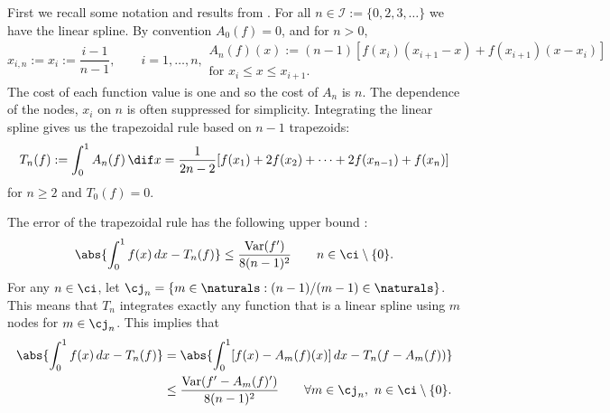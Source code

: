 \documentclass[]{elsarticle}
\DeclareMathOperator{\Var}{Var}
\theoremstyle{definition}
\theoremstyle{remark}
\begin{document}
First we recall some notation and results from \cite{HicEtal14b}.  For all $n \in \mathcal{I}:=\{0,2,3,\ldots\}$ we have the linear spline.  By convention $A_0(f)=0$, and for $n>0$, 
\begin{subequations} \label{linearspline}
\begin{equation}
x_{i,n}:=x_{i}:=\frac{i-1}{n-1}, \qquad i=1, \ldots, n,
\end{equation}
\begin{multline}
A_{n}(f)(x):=(n-1) \left[ f(x_{i})(x_{i+1}-x) +f(x_{i+1})(x-x_{i}) \right] \\ \text{for }x_{i} \leq x \leq x_{i+1}.
\end{multline}
\end{subequations}
The cost of each function value is one and so the cost of  $A_n$ is $n$. The dependence of the nodes, $x_i$ on $n$ is often suppressed for simplicity.  Integrating the linear spline gives us the trapezoidal rule based on $n-1$ trapezoids:
\begin{equation*}
    T_{n}(f) := \int_0^1 A_n(f) \, \dif x
    =\frac{1}{2n-2}[f(x_{1})+2f(x_{2})+\cdots+2f(x_{n-1})+f(x_{n})]
\end{equation*}
for $n\ge 2$ and $T_0(f)=0$.

The error of the trapezoidal rule has the following upper bound \cite[(7.15)]{BraPet11a}:
\begin{equation} \label{errbda}
\abs{\int_0^1 f(x) \, dx - T_n(f)} \le \frac{\Var(f')}{8(n-1)^2} \qquad n \in \ci\setminus \{0\}.
\end{equation}
For any $n\in \ci$, let $\cj_n = \{m \in \naturals : (n-1)/(m-1) \in \naturals \}$.  This means that $T_n$ integrates exactly any function that is a linear spline using $m$ nodes for $m\in \cj_n$. This implies that  
\begin{align} 
\nonumber
\abs{\int_0^1 f(x) \, dx - T_n(f)} &= \abs{\int_0^1 [f(x)-A_m(f)(x)] \, dx - T_n(f- A_m(f))}\\
\label{errbdb}
& \le \frac{\Var(f'-A_m(f)')}{8(n-1)^2} \qquad \forall m \in \cj_n, \ n \in \ci\setminus \{0\}.
\end{align}
\end{document}
